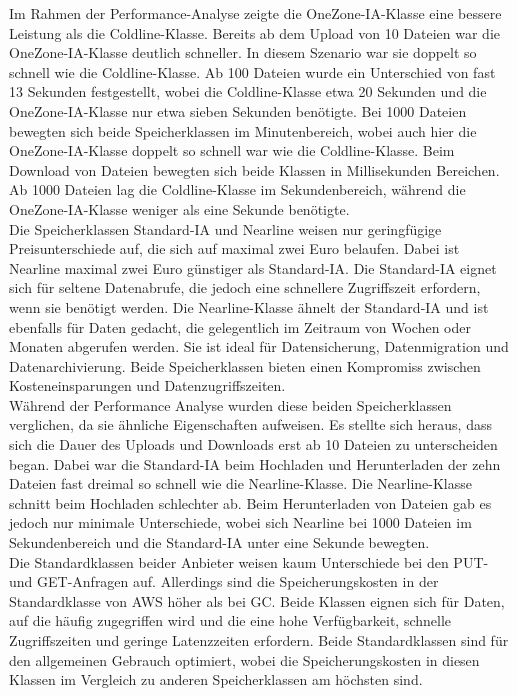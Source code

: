 Im Rahmen der Performance-Analyse zeigte die OneZone-IA-Klasse eine bessere Leistung als die Coldline-Klasse. Bereits ab dem Upload von 10 Dateien war die OneZone-IA-Klasse deutlich schneller. In diesem Szenario war sie doppelt so schnell wie die Coldline-Klasse. Ab 100 Dateien wurde ein Unterschied von fast 13 Sekunden festgestellt, wobei die Coldline-Klasse etwa 20 Sekunden und die OneZone-IA-Klasse nur etwa sieben Sekunden benötigte. Bei 1000 Dateien bewegten sich beide Speicherklassen im Minutenbereich, wobei auch hier die OneZone-IA-Klasse doppelt so schnell war wie die Coldline-Klasse. Beim Download von Dateien bewegten sich beide Klassen in Millisekunden Bereichen. Ab 1000 Dateien lag die Coldline-Klasse im Sekundenbereich, während die OneZone-IA-Klasse weniger als eine Sekunde benötigte.\\

Die Speicherklassen Standard-IA und Nearline weisen nur geringfügige Preisunterschiede auf, die sich auf maximal zwei Euro belaufen. Dabei ist Nearline maximal zwei Euro günstiger als Standard-IA. Die Standard-IA eignet sich für seltene Datenabrufe, die jedoch eine schnellere Zugriffszeit erfordern, wenn sie benötigt werden. Die Nearline-Klasse ähnelt der Standard-IA und ist ebenfalls für Daten gedacht, die gelegentlich im Zeitraum von Wochen oder Monaten abgerufen werden. Sie ist ideal für Datensicherung, Datenmigration und Datenarchivierung. Beide Speicherklassen bieten einen Kompromiss zwischen Kosteneinsparungen und Datenzugriffszeiten.\\

Während der Performance Analyse wurden diese beiden Speicherklassen verglichen, da sie ähnliche Eigenschaften aufweisen. Es stellte sich heraus, dass sich die Dauer des Uploads und Downloads erst ab 10 Dateien zu unterscheiden began. Dabei war die Standard-IA beim Hochladen und Herunterladen der zehn Dateien fast dreimal so schnell wie die Nearline-Klasse. Die Nearline-Klasse schnitt beim Hochladen schlechter ab. Beim Herunterladen von Dateien gab es jedoch nur minimale Unterschiede, wobei sich Nearline bei 1000 Dateien im Sekundenbereich und die Standard-IA unter eine Sekunde bewegten.\\

Die Standardklassen beider Anbieter weisen kaum Unterschiede bei den PUT- und GET-Anfragen auf. Allerdings sind die Speicherungskosten in der Standardklasse von AWS höher als bei GC. Beide Klassen eignen sich für Daten, auf die häufig zugegriffen wird und die eine hohe Verfügbarkeit, schnelle Zugriffszeiten und geringe Latenzzeiten erfordern. Beide Standardklassen sind für den allgemeinen Gebrauch optimiert, wobei die Speicherungskosten in diesen Klassen im Vergleich zu anderen Speicherklassen am höchsten sind.\\

